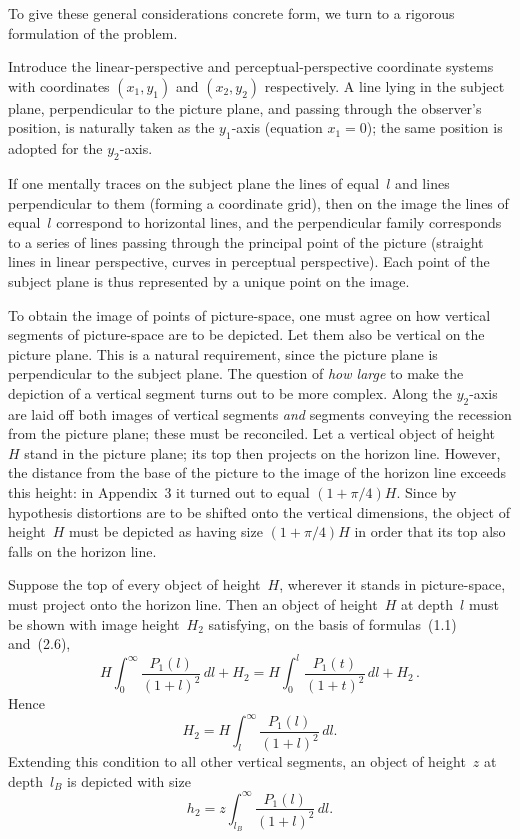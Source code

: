 To give these general considerations concrete form, we turn to a rigorous formulation of
the problem.

Introduce the linear-perspective and perceptual-perspective coordinate systems with
coordinates $(x_1, y_1)$ and $(x_2, y_2)$ respectively.  A line lying in the subject
plane, perpendicular to the picture plane, and passing through the observer's position,
is naturally taken as the $y_1$-axis (equation $x_1 = 0$); the same position is adopted
for the $y_2$-axis.

If one mentally traces on the subject plane the lines of equal~$l$ and lines perpendicular
to them (forming a coordinate grid), then on the image the lines of equal~$l$ correspond
to horizontal lines, and the perpendicular family corresponds to a series of lines passing
through the principal point of the picture (straight lines in linear perspective, curves in
perceptual perspective).  Each point of the subject plane is thus represented by a unique
point on the image.

To obtain the image of points of picture-space, one must agree on how vertical segments
of picture-space are to be depicted.  Let them also be vertical on the picture plane.
This is a natural requirement, since the picture plane is perpendicular to the subject
plane.  The question of \emph{how large} to make the depiction of a vertical segment turns
out to be more complex.  Along the $y_2$-axis are laid off both images of vertical
segments \emph{and} segments conveying the recession from the picture plane; these must be
reconciled.  Let a vertical object of height~$H$ stand in the picture plane; its top then
projects on the horizon line.  However, the distance from the base of the picture to the
image of the horizon line exceeds this height: in Appendix~3 it turned out to equal
$(1+\pi/4)H$.  Since by hypothesis distortions are to be shifted onto the vertical
dimensions, the object of height~$H$ must be depicted as having size $(1+\pi/4)H$ in
order that its top also falls on the horizon line.


Suppose the top of every object of height~$H$, wherever it stands in picture-space, must
project onto the horizon line.  Then an object of height~$H$ at depth~$l$ must be shown
with image height~$H_2$ satisfying, on the basis of formulas~(1.1) and~(2.6),
\begin{equation*}
  H \int_{0}^{\infty} \frac{P_1(l)}{(1+l)^2}\,dl + H_2
  = H \int_{0}^{l} \frac{P_1(t)}{(1+t)^2}\,dl + H_2 \, .
\end{equation*}
Hence
\begin{equation*}
  H_2 = H\int_{l}^{\infty} \frac{P_1(l)}{(1+l)^2}\,dl.
\end{equation*}
Extending this condition to all other vertical segments, an object of height~$z$ at
depth~$l_B$ is depicted with size
\begin{equation}
  h_2 = z\int_{l_B}^{\infty} \frac{P_1(l)}{(1+l)^2}\,dl.  \tag{8.1}
\end{equation}

